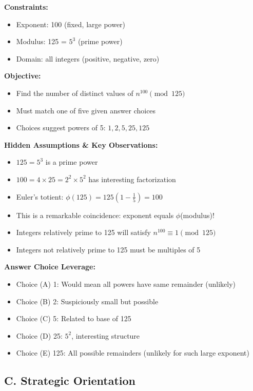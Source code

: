 \documentclass[12pt]{article}
\begin{document}
\begin{problemconfigbox}
\textbf{Constraints:}
\begin{itemize}
    \item Exponent: 100 (fixed, large power)
    \item Modulus: 125 = $5^3$ (prime power)
    \item Domain: all integers (positive, negative, zero)
\end{itemize}

\textbf{Objective:}
\begin{itemize}
    \item Find the number of distinct values of $n^{100} \pmod{125}$
    \item Must match one of five given answer choices
    \item Choices suggest powers of 5: $1, 2, 5, 25, 125$
\end{itemize}

\textbf{Hidden Assumptions \& Key Observations:}
\begin{itemize}
    \item $125 = 5^3$ is a prime power
    \item $100 = 4 \times 25 = 2^2 \times 5^2$ has interesting factorization
    \item Euler's totient: $\phi(125) = 125(1 - \frac{1}{5}) = 100$
    \item This is a remarkable coincidence: exponent equals $\phi$(modulus)!
    \item Integers relatively prime to 125 will satisfy $n^{100} \equiv 1 \pmod{125}$
    \item Integers not relatively prime to 125 must be multiples of 5
\end{itemize}

\textbf{Answer Choice Leverage:}
\begin{itemize}
    \item Choice (A) 1: Would mean all powers have same remainder (unlikely)
    \item Choice (B) 2: Suspiciously small but possible
    \item Choice (C) 5: Related to base of 125
    \item Choice (D) 25: $5^2$, interesting structure
    \item Choice (E) 125: All possible remainders (unlikely for such large exponent)
\end{itemize}

\subsection*{C. Strategic Orientation}


\end{problemconfigbox}
\end{document}
